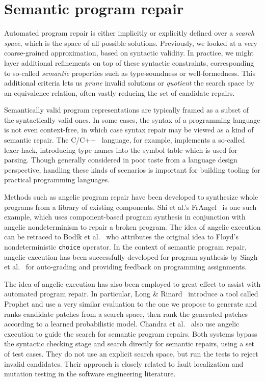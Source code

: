 \section{Semantic program repair}

Automated program repair is either implicitly or explicitly defined over a \textit{search space}, which is the space of all possible solutions. Previously, we looked at a very coarse-grained approximation, based on syntactic validity. In practice, we might layer additional refinements on top of these syntactic constraints, corresponding to so-called \textit{semantic} properties such as type-soundness or well-formedness. This additional criteria lets us \textit{prune} invalid solutions or \textit{quotient} the search space by an equivalence relation, often vastly reducing the set of candidate repairs.

Semantically valid program representations are typically framed as a subset of the syntactically valid ones. In some cases, the syntax of a programming language is not even context-free, in which case syntax repair may be viewed as a kind of semantic repair. The C/C++~\cite{mcpeak2004elkhound} language, for example, implements a so-called lexer-hack, introducing type names into the symbol table which is used for parsing. Though generally considered in poor taste from a language design perspective, handling these kinds of scenarios is important for building tooling for practical programming languages.

Methods such as angelic program repair have been developed to synthesize whole programs from a library of existing components. Shi et al.'s FrAngel~\cite{shi2019frangel} is one such example, which uses component-based program synthesis in conjunction with angelic nondeterminism to repair a broken program. The idea of angelic execution can be retraced to Bod\'ik et al.~\cite{bodik2010programming} who attributes the original idea to Floyd's nondeterministic \texttt{choice} operator. In the context of semantic program repair, angelic execution has been successfully developed for program synthesis by Singh et al.~\cite{singh2013automated} for auto-grading and providing feedback on programming assignments.

The idea of angelic execution has also been employed to great effect to assist with automated program repair. In particular, Long \& Rinard~\cite{long2016automatic} introduce a tool called Prophet and use a very similar evaluation to the one we propose to generate and ranks candidate patches from a search space, then rank the generated patches according to a learned probabilistic model. Chandra et al.~\cite{chandra2011angelic} also use angelic execution to guide the search for semantic program repairs. Both systems bypass the syntactic checking stage and search directly for semantic repairs, using a set of test cases. They do not use an explicit search space, but run the tests to reject invalid candidates. Their approach is closely related to fault localization and mutation testing in the software engineering literature.

\clearpage